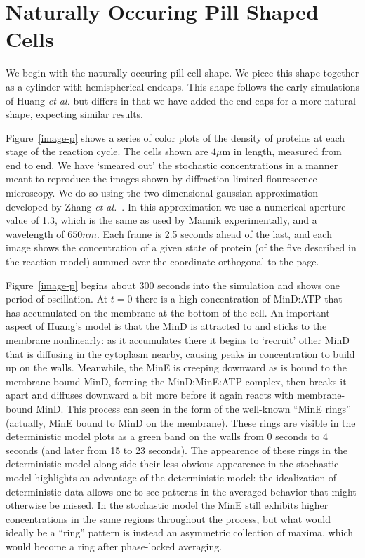 \documentclass[letterpaper,twocolumn,amsmath,amssymb,pre]{revtex4-1}
\newcommand\micron{\ensuremath{\mu\text{m}}}
\begin{document}
\section{Naturally Occuring Pill Shaped Cells}

We begin with the naturally occuring pill cell shape.  We piece this
shape together as a cylinder with hemispherical endcaps.  This shape
follows the early simulations of Huang \emph{et al.} but differs in
that we have added the end caps for a more natural shape, expecting
similar results.

Figure~\ref{image-p} shows a series of color plots of the density of
proteins at each stage of the reaction cycle. The cells shown are
$4\micron$ in length, measured from end to end.  We have `smeared out'
the stochastic concentrations in a manner meant to reproduce the
images shown by diffraction limited flourescence microscopy.  We do so
using the two dimensional gaussian approximation developed by Zhang
\emph{et al.}~\cite{zhang2007gaussian}.  In this approximation we use
a numerical aperture value of 1.3, which is the same as used by Mannik
experimentally, and a wavelength of $650nm$.  Each frame is 2.5
seconds ahead of the last, and each image shows the concentration of a
given state of protein (of the five described in the reaction model)
summed over the coordinate orthogonal to the page.

Figure~\ref{image-p} begins about 300 seconds into the simulation and
shows one period of oscillation.  At $t=0$ there is a high
concentration of MinD:ATP that has accumulated on the membrane at the
bottom of the cell. An important aspect of Huang's model is that the
MinD is attracted to and sticks to the membrane nonlinearly: as it
accumulates there it begins to `recruit' other MinD that is diffusing
in the cytoplasm nearby, causing peaks in concentration to build up on
the walls.  Meanwhile, the MinE is creeping downward as is bound to
the membrane-bound MinD, forming the MinD:MinE:ATP complex, then
breaks it apart and diffuses downward a bit more before it again
reacts with membrane-bound MinD.  This process can seen in the form of
the well-known ``MinE rings'' (actually, MinE bound to MinD on the
membrane).  These rings are visible in the deterministic model plots
as a green band on the walls from 0 seconds to 4 seconds (and later
from 15 to 23 seconds).  The appearence of these rings in the
deterministic model along side their less obvious appearence in the
stochastic model highlights an advantage of the deterministic model:
the idealization of deterministic data allows one to see patterns in
the averaged behavior that might otherwise be missed.  In the
stochastic model the MinE still exhibits higher concentrations in the
same regions throughout the process, but what would ideally be a
``ring'' pattern is instead an asymmetric collection of maxima, which
would become a ring after phase-locked averaging.
\end{document}
